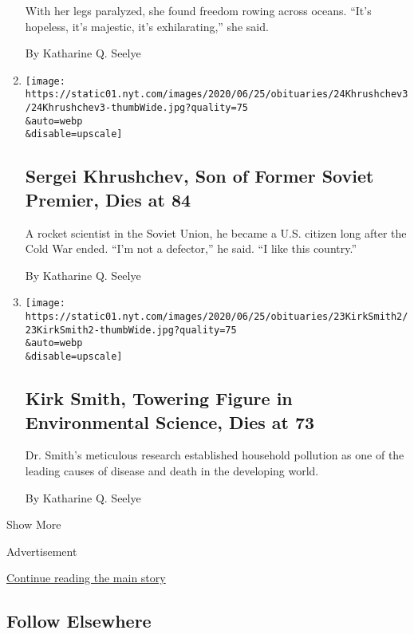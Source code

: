 \begin{enumerate}
  With her legs paralyzed, she found freedom rowing across oceans.
  ``It's hopeless, it's majestic, it's exhilarating,'' she said.

  By Katharine Q. Seelye
\item
  \href{/2020/06/24/us/sergei-khrushchev-dead.html}{}

  \texttt{[image: https://static01.nyt.com/images/2020/06/25/obituaries/24Khrushchev3/24Khrushchev3-thumbWide.jpg?quality=75\\\&auto=webp\\\&disable=upscale]}

  \hypertarget{sergei-khrushchev-son-of-former-soviet-premier-dies-at-84}{%
  \subsection{Sergei Khrushchev, Son of Former Soviet Premier, Dies at
  84}\label{sergei-khrushchev-son-of-former-soviet-premier-dies-at-84}}

  A rocket scientist in the Soviet Union, he became a U.S. citizen long
  after the Cold War ended. ``I'm not a defector,'' he said. ``I like
  this country.''

  By Katharine Q. Seelye
\item
  \href{/2020/06/24/climate/kirk-smith-dead.html}{}

  \texttt{[image: https://static01.nyt.com/images/2020/06/25/obituaries/23KirkSmith2/23KirkSmith2-thumbWide.jpg?quality=75\\\&auto=webp\\\&disable=upscale]}

  \hypertarget{kirk-smith-towering-figure-in-environmental-science-dies-at-73}{%
  \subsection{Kirk Smith, Towering Figure in Environmental Science, Dies
  at
  73}\label{kirk-smith-towering-figure-in-environmental-science-dies-at-73}}

  Dr. Smith's meticulous research established household pollution as one
  of the leading causes of disease and death in the developing world.

  By Katharine Q. Seelye
\end{enumerate}

Show More

Advertisement

\protect\hyperlink{after-mid2}{Continue reading the main story}

\hypertarget{follow-elsewhere}{%
\subsection{Follow Elsewhere}\label{follow-elsewhere}}

